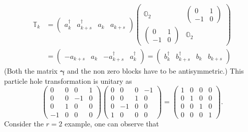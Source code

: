 \documentclass[aps, preprint]{revtex4}
\begin{document}
\begin{align}\mathbb{T}_{k} &  =\left (\begin{array}{cccc}a_{k}^{ \dag } & a_{k +s}^{ \dag } & a_{k} & a_{k +s}\end{array}\right ) \left (\begin{array}{cc}\mathbb{O}_{2} & \left (\begin{array}{cc}0 & 1 \\
 -1 & 0\end{array}\right ) \\
\left (\begin{array}{cc}0 & 1 \\
 -1 & 0\end{array}\right ) & \mathbb{O}_{2}\end{array}\right ) \\
 &  =\left (\begin{array}{cccc} -a_{k +s} & a_{k} &  -a_{k +s}^{ \dag } & a_{k}^{ \dag }\end{array}\right ) =\left (\begin{array}{cccc}b_{k}^{ \dag } & b_{k +s}^{ \dag } & b_{k} & b_{k +s}\end{array}\right )\end{align}(Both the matrix $\mathbf{\gamma }$ and the non zero blocks have to be antisymmetric.) This particle hole transformation is unitary as
\begin{equation}\left (\begin{array}{cccc}0 & 0 & 0 & 1 \\
0 & 0 &  -1 & 0 \\
0 & 1 & 0 & 0 \\
 -1 & 0 & 0 & 0\end{array}\right ) \left (\begin{array}{cccc}0 & 0 & 0 &  -1 \\
0 & 0 & 1 & 0 \\
0 &  -1 & 0 & 0 \\
1 & 0 & 0 & 0\end{array}\right ) =\left (\begin{array}{cccc}1 & 0 & 0 & 0 \\
0 & 1 & 0 & 0 \\
0 & 0 & 1 & 0 \\
0 & 0 & 0 & 1\end{array}\right )\text{.}
\end{equation}Consider the $r =2$ example, one can observe that
\end{document}
